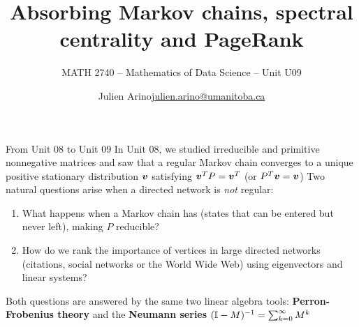 \documentclass[aspectratio=169]{beamer}\usepackage[]{graphicx}\usepackage[]{xcolor}
\subtitle{MATH 2740 -- Mathematics of Data Science -- Unit U09}
\author{\texorpdfstring{Julien Arino\newline\url{julien.arino@umanitoba.ca}}{Julien Arino}}
\institute{Department of Mathematics @ University of Manitoba}
\title{Absorbing Markov chains, spectral centrality and PageRank}
\begin{document}
\setcounter{theorem}{137}

\SStitlepage
\SSoutlinepage

\begin{frame}{From Unit 08 to Unit 09}
In Unit 08, we studied irreducible and primitive nonnegative matrices and saw that a regular Markov chain converges to a unique positive stationary distribution $\bm{v}$ satisfying $\bm{v}^T P = \bm{v}^T$ (or $P^T\bm{v} = \bm{v}$)
\vfill
Two natural questions arise when a directed network is \emph{not} regular:
\begin{enumerate}
\item What happens when a Markov chain has  (states that can be entered but never left), making $P$ reducible?
\item How do we rank the importance of vertices in large directed networks (citations, social networks or the World Wide Web) using eigenvectors and linear systems?
\end{enumerate}
\vfill
Both questions are answered by the same two linear algebra tools: \textbf{Perron-Frobenius theory} and the \textbf{Neumann series} $(\mathbb{I} - M)^{-1} = \sum_{k=0}^\infty M^k$
\end{frame}



\end{document}
